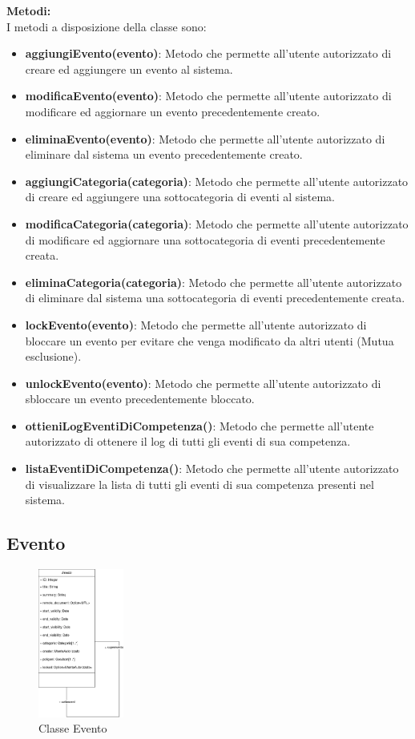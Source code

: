 \documentclass{article}
\begin{document}
\textbf{Metodi:}\\
I metodi a disposizione della classe sono:
\begin{itemize}
	\item \textbf{aggiungiEvento(evento)}: Metodo che permette all'utente autorizzato di creare ed aggiungere un evento al sistema.
	\item \textbf{modificaEvento(evento)}: Metodo che permette all'utente autorizzato di modificare ed aggiornare un evento precedentemente creato.
	\item \textbf{eliminaEvento(evento)}: Metodo che permette all'utente autorizzato di eliminare dal sistema un evento precedentemente creato.
	\item \textbf{aggiungiCategoria(categoria)}: Metodo che permette all'utente autorizzato di creare ed aggiungere una sottocategoria di eventi al sistema.
	\item \textbf{modificaCategoria(categoria)}: Metodo che permette all'utente autorizzato di modificare ed aggiornare una sottocategoria di eventi precedentemente creata.
	\item \textbf{eliminaCategoria(categoria)}: Metodo che permette all'utente autorizzato di eliminare dal sistema una sottocategoria di eventi precedentemente creata.
	\item \textbf{lockEvento(evento)}: Metodo che permette all'utente autorizzato di bloccare un evento per evitare che venga modificato da altri utenti (Mutua esclusione).
	\item \textbf{unlockEvento(evento)}: Metodo che permette all'utente autorizzato di sbloccare un evento precedentemente bloccato.
	\item \textbf{ottieniLogEventiDiCompetenza()}: Metodo che permette all'utente autorizzato di ottenere il log di tutti gli eventi di sua competenza.
	\item \textbf{listaEventiDiCompetenza()}: Metodo che permette all'utente autorizzato di visualizzare la lista di tutti gli eventi di sua competenza presenti nel sistema.
\end{itemize}

\clearpage

\subsection{Evento}

\begin{figure}[htbp]
	\centering
	\includegraphics[width=0.25\textwidth]{Images/Evento-Class.png}
	\caption{Classe Evento}
	\label{fig:evento}
\end{figure}
\end{document}
